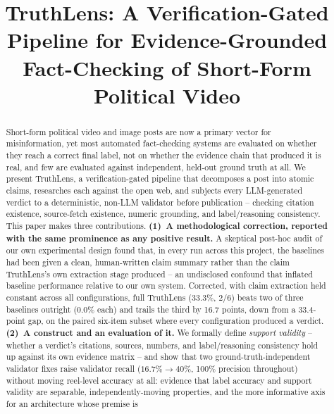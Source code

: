 \documentclass[conference]{IEEEtran}
\begin{document}
\title{TruthLens: A Verification-Gated Pipeline for Evidence-Grounded Fact-Checking of Short-Form Political Video}

\author{
}

\maketitle

\begin{abstract}
Short-form political video and image posts are now a primary vector for
misinformation, yet most automated fact-checking systems are evaluated on
whether they reach a correct final label, not on whether the evidence chain
that produced it is real, and few are evaluated against independent,
held-out ground truth at all. We present TruthLens, a verification-gated
pipeline that decomposes a post into atomic claims, researches each against
the open web, and subjects every LLM-generated verdict to a deterministic,
non-LLM validator before publication -- checking citation existence,
source-fetch existence, numeric grounding, and label/reasoning consistency.
This paper makes three contributions. \textbf{(1)~A methodological
correction, reported with the same prominence as any positive result.}
A skeptical post-hoc audit of our own experimental design found that, in
every run across this project, the baselines had been given a clean,
human-written claim summary rather than the claim TruthLens's own
extraction stage produced -- an undisclosed confound that inflated
baseline performance relative to our own system. Corrected, with claim
extraction held constant across all configurations, full TruthLens
(33.3\%, 2/6) beats two of three baselines outright (0.0\% each) and
trails the third by 16.7 points, down from a 33.4-point gap, on the
paired six-item subset where every configuration produced a verdict.
\textbf{(2)~A construct and an evaluation of it.} We formally define
\emph{support validity} -- whether a verdict's citations, sources,
numbers, and label/reasoning consistency hold up against its own evidence
matrix -- and show that two ground-truth-independent validator fixes
raise validator recall ($16.7\%\to40\%$, 100\% precision throughout)
without moving reel-level accuracy at all: evidence that label accuracy
and support validity are separable, independently-moving properties, and
the more informative axis for an architecture whose premise is

\end{abstract}
\end{document}
